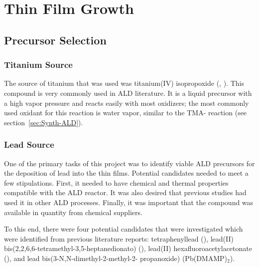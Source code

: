 \chapter{Thin Film Growth}
\label{ch:SampFab}
\thispagestyle{empty}



\section{Precursor Selection}
\label{sec:SampFab-Precursors}

\lipsum

\subsection{Titanium Source}

The source of titanium that was used was titanium(IV) isopropoxide (\TiOiPr{}, ). This compound is very commonly used in ALD literature.\cite{cianci_atomic_2012,tallarida_growth_2011,lehnert_plasma_2012,cleveland_role_2012,kubrin_stacking_2012,lee_emph-situ_2012} It is a liquid precursor with a high vapor pressure and reacts easily with most oxidizers; the most commonly used oxidant for this reaction is water vapor, similar to the TMA- reaction (see section~\vref{sec:Synth-ALD}). 

\subsection{Lead Source}

One of the primary tasks of this project was to identify viable ALD precursors for the deposition of lead into the thin films. Potential candidates needed to meet a few stipulations. First, it needed to have chemical and thermal properties compatible with the ALD reactor. It was also desired that previous studies had used it in other ALD processes. Finally, it was important that the compound was available in quantity from chemical suppliers. 

To this end, there were four potential candidates that were investigated which were identified from previous literature reports: tetraphenyllead ()\cite{harjuoja_2006}, lead(II) bis(2,2,6,6-tetramethyl-3,5-heptanedionato) ()\cite{watanabe_growth_2007}, lead(II) hexafluoroacetylacetonate ()\cite{Igumenov_1998}, and lead bis(3-N,N-dimethyl-2-methyl-2- propanoxide) (Pb(DMAMP)$_{2}$).\cite{Hwang_2007}

